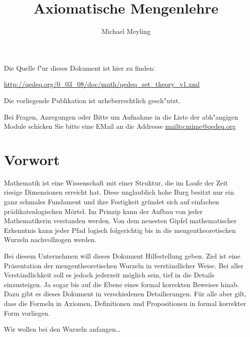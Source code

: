\documentclass[a4paper,german,10pt,twoside]{book}
\title{Axiomatische Mengenlehre}
\author{
Michael Meyling
}
\theoremstyle{definition}
\theoremstyle{remark}
\begin{document}
\maketitle

\setlength{\parskip}{5pt plus 2pt minus 1pt}
\mbox{}
\vfill

\par
Die Quelle f{"ur} dieses Dokument ist hier zu finden:
\par
\url{http://qedeq.org/0_03_08/doc/math/qedeq_set_theory_v1.xml}

\par
Die vorliegende Publikation ist urheberrechtlich gesch{"u}tzt.
\par
Bei Fragen, Anregungen oder Bitte um Aufnahme in die Liste der abh{"a}ngigen Module schicken Sie bitte eine EMail an die Addresse \url{mailto:mime@qedeq.org}

\setlength{\parskip}{0pt}
\tableofcontents

\setlength{\parskip}{5pt plus 2pt minus 1pt}

\chapter*{Vorwort\label{ch:preface}} \label{chapter0} \hypertarget{chapter0}{}

Mathematik ist eine Wissenschaft mit einer Struktur, die im Laufe der Zeit riesige Dimensionen erreicht hat. Diese unglaublich hohe Burg besitzt nur ein ganz schmales Fundament und ihre Festigkeit gr{\"u}ndet sich auf einfachen pr{\"a}dikatenlogischen M{\"o}rtel. Im Prinzip kann der Aufbau von jeder Mathematikerin verstanden werden. Von dem neuesten Gipfel mathematischer Erkenntnis kann jeder Pfad logisch folgerichtig bis in die mengentheoretischen Wurzeln nachvollzogen werden.

\par
Bei diesem Unternehmen will dieses Dokument Hilfestellung geben. Ziel ist eine Pr{\"a}sentation der mengentheoretischen Wurzeln in verst{\"a}ndlicher Weise. Bei aller Verst{\"a}ndlichkeit soll es jedoch jederzeit m{\"o}glich sein, tief in die Details einzusteigen. Ja sogar bis auf die Ebene eines formal korrekten Beweises hinab. Dazu gibt es dieses Dokument in verschiedenen Detailierungen. F{\"u}r alle aber gilt, dass die Formeln in Axiomen, Definitionen und Propositionen in formal korrekter Form vorliegen.

\par
Wir wollen bei den Wurzeln anfangen\ldots
\end{document}
